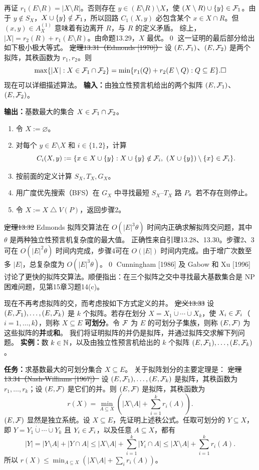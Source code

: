 再证 $r_1(E\setminus R)=|X\setminus R|$。否则存在 $y\in(E\setminus R)\setminus X$，使 $(X\setminus R)\cup\{y\}\in\mathcal F_1$。由于 $y\notin S_X$，$X\cup\{y\}\notin\mathcal F_1$，所以回路 $C_1(X,y)$ 必包含某个 $x\in X\cap R$。但 $(x,y)\in A_X^{(1)}$ 意味着有边离开 $R$，与 $R$ 的定义矛盾。
综上，$|X|=r_2(R)+r_1(E\setminus R)$。由命题13.29，$X$ 最优。\qed
这一证明的最后部分给出如下极小极大等式。
\st{定理13.31（Edmonds [1970]）} 设 $(E,\mathcal F_1)$、$(E,\mathcal F_2)$ 是两个拟阵，其秩函数为 $r_1,r_2$。则
\[\max\{|X|:X\in\mathcal F_1\cap\mathcal F_2\}=\min\{r_1(Q)+r_2(E\setminus Q):Q\subseteq E\}.\square\]
现在可以详细描述算法。
\textbf{输入：}由独立性预言机给出的两个拟阵 $(E,\mathcal F_1)$、$(E,\mathcal F_2)$。\par
\textbf{输出：}基数最大的集合 $X\in\mathcal F_1\cap\mathcal F_2$。
\begin{enumerate}[label=\arabic*.]
\item 令 $X:=\varnothing$。
\item 对每个 $y\in E\setminus X$ 和 $i\in\{1,2\}$，计算
\[C_i(X,y):=\{x\in X\cup\{y\}:X\cup\{y\}\notin\F_i,\ (X\cup\{y\})\setminus\{x\}\in\F_i\}.\]
\item 按前面的定义计算 $S_X,T_X,G_X$。
\item 用广度优先搜索（BFS）在 $G_X$ 中寻找最短 $S_X$--$T_X$ 路 $P$。若不存在则停止。
\item 令 $X:=X\mathbin{\triangle}V(P)$，返回步骤2。
\end{enumerate}
\st{定理13.32} Edmonds 拟阵交算法在 $O(|E|^3\theta)$ 时间内正确求解拟阵交问题，其中 $\theta$ 是两种独立性预言机复杂度的最大值。
\pr 正确性来自引理13.28、13.30。步骤2、3可在 $O(|E|^2\theta)$ 时间内完成，步骤4可在 $O(|E|)$ 时间内完成。由于增广次数至多 $|E|$，总复杂度为 $O(|E|^3\theta)$。\qed
Cunningham [1986] 及 Gabow 和 Xu [1996] 讨论了更快的拟阵交算法。顺便指出：在三个拟阵之交中寻找最大基数集合是 NP 困难问题，见第15章习题14(c)。

现在不再考虑拟阵的交，而考虑按如下方式定义的并。
\st{定义13.33} 设 $(E,\mathcal F_1),\ldots,(E,\mathcal F_k)$ 是 $k$ 个拟阵。若存在划分 $X=X_1\mathbin{\dot\cup}\cdots\mathbin{\dot\cup}X_k$，使 $X_i\in\mathcal F_i$（$i=1,\ldots,k$），则称 $X\subseteq E$ \textbf{可划分}。令 $\mathcal F$ 为 $E$ 的可划分子集族，则称 $(E,\mathcal F)$ 为这些拟阵的\textbf{并}或\textbf{和}。
我们将证明拟阵的并仍是拟阵，并通过拟阵交求解下列问题。
\textbf{实例：}数 $k\in\mathbb N$，以及由独立性预言机给出的 $k$ 个拟阵 $(E,\mathcal F_1),\ldots,(E,\mathcal F_k)$。\par
\textbf{任务：}求基数最大的可划分集合 $X\subseteq E$。
关于拟阵划分的主要定理是：
\st{定理13.34（Nash-Williams [1967]）} 设 $(E,\mathcal F_1),\ldots,(E,\mathcal F_k)$ 是拟阵，其秩函数为 $r_1,\ldots,r_k$；设 $(E,\mathcal F)$ 是它们的并。则 $(E,\mathcal F)$ 是拟阵，其秩函数为
\[r(X)=\min_{A\subseteq X}\left(|X\setminus A|+\sum_{i=1}^kr_i(A)\right).\]
\pr $(E,\mathcal F)$ 显然是独立系统。设 $X\subseteq E$，先证明上述秩公式。任取可划分的 $Y\subseteq X$，即 $Y=Y_1\mathbin{\dot\cup}\cdots\mathbin{\dot\cup}Y_k$ 且 $Y_i\in\mathcal F_i$，以及任意 $A\subseteq X$，都有
\[|Y|=|Y\setminus A|+|Y\cap A|\le|X\setminus A|+\sum_{i=1}^k|Y_i\cap A|
\le|X\setminus A|+\sum_{i=1}^kr_i(A).\]
所以 $r(X)\le\min_{A\subseteq X}(|X\setminus A|+\sum_i r_i(A))$。

